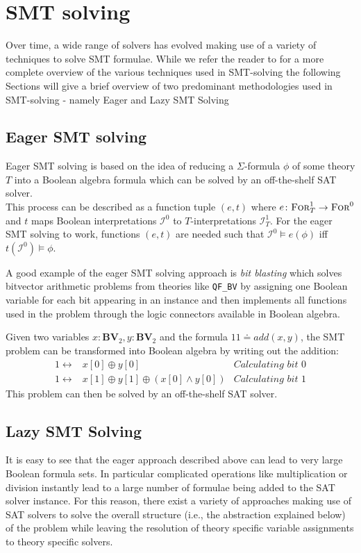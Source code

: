 \section{SMT solving}
Over time, a wide range of solvers has evolved making use of a variety of techniques to solve SMT formulae. While we refer the reader to \cite{Barrett-Tinelli-SMT} for a more complete overview of the various techniques used in SMT-solving the following Sections will give a brief overview of two predominant methodologies used in SMT-solving - namely Eager and Lazy SMT Solving 
\subsection{Eager SMT solving}
Eager SMT solving is based on the idea of reducing a $\Sigma$-formula $\phi$ of some theory $T$ into a Boolean algebra formula which can be solved by an off-the-shelf SAT solver.\\
This process can be described as a function tuple $(e,t)$ where $e\colon\textsc{For}^1_T\to\textsc{For}^0$ and $t$ maps Boolean interpretations $\mathcal{I}^0$ to $T$-interpretations $\mathcal{I}^1_T$. For the eager SMT solving to work, functions $(e,t)$ are needed such that $\mathcal{I}^0\vDash e\left(\phi\right)$ iff $t\left(\mathcal{I}^0\right)\vDash\phi$.
\par
A good example of the eager SMT solving approach is \textit{bit blasting} which solves bitvector arithmetic problems from theories like \texttt{QF\_BV} by assigning one Boolean variable for each bit appearing in an instance and then implements all functions used in the problem through the logic connectors available in Boolean algebra.
\begin{example}[Addition]
Given two variables $x\colon\mathbf{BV}_2, y\colon\mathbf{BV}_2$ and the formula $11\doteq add\left(x,y\right)$,
the SMT problem can be transformed into Boolean algebra by writing out the addition:
\begin{align*}
1 \leftrightarrow & x[0] \oplus y[0] & \textit{Calculating bit 0}\\
1 \leftrightarrow & x[1] \oplus y[1] \oplus \left(x[0] \land y[0] \right) & \textit{Calculating bit 1}
\end{align*}
This problem can then be solved by an off-the-shelf SAT solver.
\end{example}

\subsection{Lazy SMT Solving}
It is easy to see that the eager approach described above can lead to very large Boolean formula sets. In particular complicated operations like multiplication or division instantly lead to a large number of formulae being added to the SAT solver instance. For this reason, there exist a variety of approaches making use of SAT solvers to solve the overall structure (i.e., the abstraction explained below) of the problem while leaving the resolution of theory specific variable assignments to theory specific solvers.
